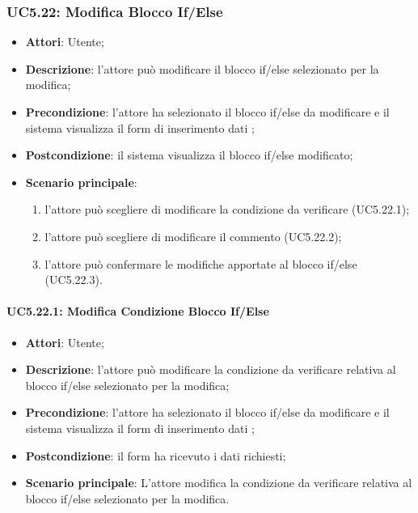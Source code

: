 \subsubsection{UC5.22: Modifica Blocco If/Else}
\label{UC5.22}
\begin{itemize}
\item \textbf{Attori}: Utente;
\item \textbf{Descrizione}: l'attore può modificare il blocco if/else selezionato per la modifica;
\item \textbf{Precondizione}: l'attore ha selezionato il blocco if/else da modificare e il sistema visualizza il form di inserimento dati ;	
\item \textbf{Postcondizione}: il sistema visualizza il blocco if/else modificato;	
\item \textbf{Scenario principale}:
\begin{enumerate}
\item l'attore può scegliere di modificare la condizione da verificare (UC5.22.1);
\item l'attore può scegliere di modificare il commento (UC5.22.2);
\item l'attore può confermare le modifiche apportate al blocco if/else (UC5.22.3).
\end{enumerate}
\end{itemize}
\paragraph{UC5.22.1: Modifica Condizione Blocco If/Else}
\label{UC5.22.1}
\begin{itemize}
\item \textbf{Attori}: Utente;
\item \textbf{Descrizione}: l'attore può modificare la condizione da verificare relativa al blocco if/else selezionato per la modifica;
\item \textbf{Precondizione}: l'attore ha selezionato il blocco if/else da modificare e il sistema visualizza il form di inserimento dati ;	
\item \textbf{Postcondizione}: il form ha ricevuto i dati richiesti;	
\item \textbf{Scenario principale}:
L'attore modifica la condizione da verificare relativa al blocco if/else selezionato per la modifica.
\end{itemize}
